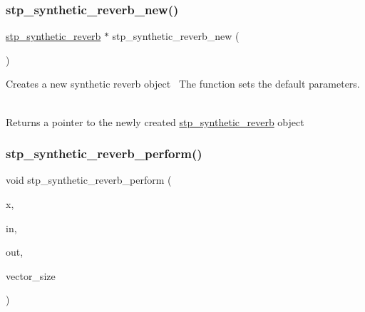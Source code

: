 \subsubsection{\texorpdfstring{stp\+\_\+synthetic\+\_\+reverb\+\_\+new()}{stp\_synthetic\_reverb\_new()}}
{\footnotesize\ttfamily \hyperlink{structstp__synthetic__reverb}{stp\+\_\+synthetic\+\_\+reverb} $\ast$ stp\+\_\+synthetic\+\_\+reverb\+\_\+new (\begin{DoxyParamCaption}{ }\end{DoxyParamCaption})\hspace{0.3cm}{\ttfamily [related]}}



Creates a new synthetic reverb object~\newline
 The function sets the default parameters. ~\newline
 

\begin{DoxyReturn}{Returns}
a pointer to the newly created \hyperlink{structstp__synthetic__reverb}{stp\+\_\+synthetic\+\_\+reverb} object ~\newline
 
\end{DoxyReturn}
\mbox{\label{structstp__synthetic__reverb_af385f69d342da49868fe1c9b8bf0a11a}} 
\subsubsection{\texorpdfstring{stp\+\_\+synthetic\+\_\+reverb\+\_\+perform()}{stp\_synthetic\_reverb\_perform()}}
{\footnotesize\ttfamily void stp\+\_\+synthetic\+\_\+reverb\+\_\+perform (\begin{DoxyParamCaption}\item[{\hyperlink{structstp__synthetic__reverb}{stp\+\_\+synthetic\+\_\+reverb} $\ast$}]{x,  }\item[{\hyperlink{stp__defines_8h_a142134bffa517ce86ebf0bdcdbe975d2}{S\+T\+P\+\_\+\+I\+N\+P\+U\+T\+V\+E\+C\+T\+OR} $\ast$}]{in,  }\item[{\hyperlink{stp__defines_8h_a0a4fde8c3943f5267ab6f09538b3ac26}{S\+T\+P\+\_\+\+O\+U\+T\+P\+U\+T\+V\+E\+C\+T\+OR} $\ast$}]{out,  }\item[{int}]{vector\+\_\+size }\end{DoxyParamCaption})\hspace{0.3cm}{\ttfamily [related]}}



